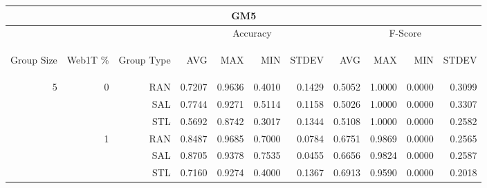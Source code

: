 \begin{center}
\begin{table}[htbp] 
 \begin{center}
\begin{tabular}{ | r | r | r | r | r | r | r | r | r | r | r |}
\hline
\multicolumn{11}{|c|}{GM5}\\
\hline
 & & & \multicolumn{4}{|c|}{Accuracy} & \multicolumn{4}{|c|}{F-Score}\\ \cline{4-11}
\begin{sideways}Group Size\end{sideways} & \begin{sideways}Web1T \%\end{sideways} & \begin{sideways}Group Type\end{sideways} & \begin{sideways}AVG\end{sideways} & \begin{sideways}MAX\end{sideways} & \begin{sideways}MIN\end{sideways} & \begin{sideways}STDEV\end{sideways} & \begin{sideways}AVG\end{sideways} & \begin{sideways}MAX\end{sideways} & \begin{sideways}MIN\end{sideways} & \begin{sideways}STDEV\end{sideways}\\
\hline
\multirow{18}{*}{5}
 & \multirow{3}{*}{0} & RAN & 0.7207 & 0.9636 & 0.4010 & 0.1429 & 0.5052 & 1.0000 & 0.0000 & 0.3099\\ \cline{3-11}
 &   & SAL & 0.7744 & 0.9271 & 0.5114 & 0.1158 & 0.5026 & 1.0000 & 0.0000 & 0.3307\\ \cline{3-11}
 &   & STL & 0.5692 & 0.8742 & 0.3017 & 0.1344 & 0.5108 & 1.0000 & 0.0000 & 0.2582\\ \cline{2-11}
 & \multirow{3}{*}{1} & RAN & 0.8487 & 0.9685 & 0.7000 & 0.0784 & 0.6751 & 0.9869 & 0.0000 & 0.2565\\ \cline{3-11}
 &   & SAL & 0.8705 & 0.9378 & 0.7535 & 0.0455 & 0.6656 & 0.9824 & 0.0000 & 0.2587\\ \cline{3-11}
 &   & STL & 0.7160 & 0.9274 & 0.4000 & 0.1367 & 0.6913 & 0.9590 & 0.0000 & 0.2018\\ \cline{2-11}

\end{tabular}
\end{center}
\end{table}
\end{center}
